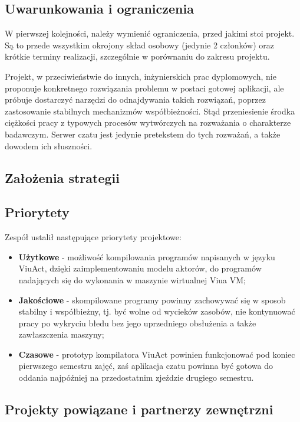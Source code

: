 \documentclass[11pt,oneside,a4paper,titlepage,onecolumn]{article}
\begin{document}
\subsection{Uwarunkowania i ograniczenia}

W pierwszej kolejności, należy wymienić ograniczenia, przed jakimi stoi projekt. Są to przede wszystkim okrojony skład osobowy (jedynie 2 członków) oraz krótkie terminy realizacji, szczególnie w porównaniu do zakresu projektu.

Projekt, w przeciwieństwie do innych, inżynierskich prac dyplomowych, nie proponuje konkretnego rozwiązania problemu w postaci gotowej aplikacji, ale próbuje dostarczyć narzędzi do odnajdywania takich rozwiązań, poprzez zastosowanie stabilnych mechanizmów współbieżności. Stąd przeniesienie środka ciężkości pracy z typowych procesów wytwórczych na rozważania o charakterze badawczym. Serwer czatu jest jedynie pretekstem do tych rozważań, a także dowodem ich słuszności.

\subsection{Założenia strategii}

\subsection{Priorytety}

Zespół ustalił następujące priorytety projektowe:

\begin{itemize}
	\item \textbf{Użytkowe} - możliwość kompilowania programów napisanych w języku ViuAct, dzięki zaimplementowaniu modelu aktorów, do programów nadających się do wykonania w maszynie wirtualnej Viua VM;
	\item \textbf{Jakościowe} - skompilowane programy powinny zachowywać się w sposob stabilny i współbieżny, tj. być wolne od wycieków zasobów, nie kontynuować pracy po wykryciu błedu bez jego uprzedniego obsłużenia a także zawłaszczenia maszyny;
	\item \textbf{Czasowe} - prototyp kompilatora ViuAct powinien funkcjonować pod koniec pierwszego semestru zajęć, zaś aplikacja czatu powinna być gotowa do oddania najpóźniej na przedostatnim zjeździe drugiego semestru.
\end{itemize}

\subsection{Projekty powiązane i partnerzy zewnętrzni}
\end{document}
